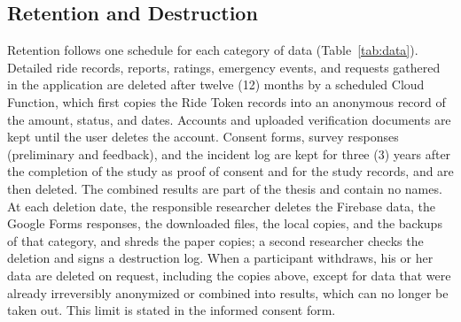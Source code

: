 \subsection[Retention and Destruction]{Retention and Destruction}\label{sec:retention}
Retention follows one schedule for each category of data (Table~\ref{tab:data}). Detailed ride records, reports, ratings, emergency events, and requests gathered in the application are deleted after twelve (12) months by a scheduled Cloud Function, which first copies the Ride Token records into an anonymous record of the amount, status, and dates. Accounts and uploaded verification documents are kept until the user deletes the account. Consent forms, survey responses (preliminary and feedback), and the incident log are kept for three (3) years after the completion of the study as proof of consent and for the study records, and are then deleted. The combined results are part of the thesis and contain no names. At each deletion date, the responsible researcher deletes the Firebase data, the Google Forms responses, the downloaded files, the local copies, and the backups of that category, and shreds the paper copies; a second researcher checks the deletion and signs a destruction log. When a participant withdraws, his or her data are deleted on request, including the copies above, except for data that were already irreversibly anonymized or combined into results, which can no longer be taken out. This limit is stated in the informed consent form.

